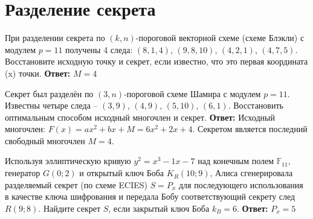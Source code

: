 \section{Разделение секрета}
\tasksection

\tasknumber При разделении секрета по $(k, n)$-пороговой векторной схеме (схеме Блэкли) с модулем $p = 11$ получены 4 следа: $\left( {8,1,4} \right)$, $\left( {9,8,10} \right)$, $\left( {4,2,1} \right)$, $\left( {4,7,5} \right)$. Восстановите исходную точку и секрет, если известно, что это первая координата (x) точки.
\medbreak
\textbf{Ответ:} $M = 4$
\bigbreak

\tasknumber Секрет был разделён по $(3, n)$-пороговой схеме Шамира с модулем $p=11$. Известны четыре следа -- $\left( {3,9} \right)$, $\left( {4,9} \right)$, $\left( {5,10} \right)$, $\left( {6,1} \right)$. Восстановить оптимальным способом исходный многочлен и секрет.
\medbreak
\textbf{Ответ:} Исходный многочлен: $F\left( x \right) = ax^2  + bx + M = 6x^2  + 2x + 4$. Секретом является последний свободный многочлен $M = 4$.
\bigbreak

\tasknumber Используя эллиптическую кривую $y^2 = x^3 - 1x - 7$ над конечным полем $\mathbb{F}_{11}$, генератор $G(0; 2)$ и открытый ключ Боба $K_R(10; 9)$, Алиса сгенерировала разделяемый секрет (по схеме ECIES) $S=P_x$ для последующего использования в качестве ключа шифрования и передала Бобу соответствующий секрету след $R(9; 8)$. Найдите секрет $S$, если закрытый ключ Боба $k_B = 6$.
\medbreak
\textbf{Ответ:} $P_x = 5$
